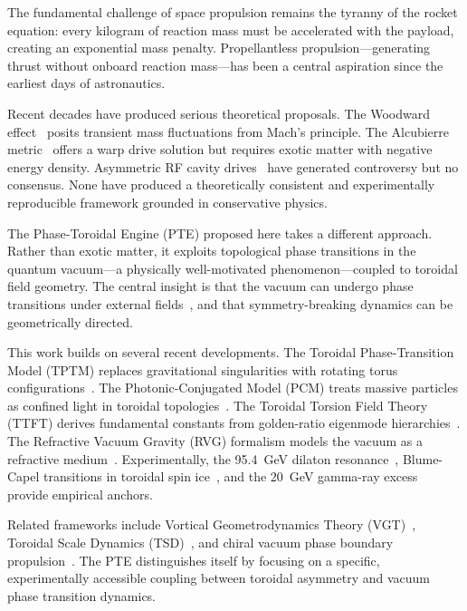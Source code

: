 \documentclass[preprint,12pt]{elsarticle}
\begin{document}
The fundamental challenge of space propulsion remains the tyranny of the rocket equation: every kilogram of reaction mass must be accelerated with the payload, creating an exponential mass penalty. Propellantless propulsion---generating thrust without onboard reaction mass---has been a central aspiration since the earliest days of astronautics.

Recent decades have produced serious theoretical proposals. The Woodward effect~\cite{woodward1990} posits transient mass fluctuations from Mach's principle. The Alcubierre metric~\cite{alcubierre1994} offers a warp drive solution but requires exotic matter with negative energy density. Asymmetric RF cavity drives~\cite{shawyer2008,white2021} have generated controversy but no consensus. None have produced a theoretically consistent and experimentally reproducible framework grounded in conservative physics.

The Phase-Toroidal Engine (PTE) proposed here takes a different approach. Rather than exotic matter, it exploits topological phase transitions in the quantum vacuum---a physically well-motivated phenomenon---coupled to toroidal field geometry. The central insight is that the vacuum can undergo phase transitions under external fields~\cite{volovik2003,wen2004}, and that symmetry-breaking dynamics can be geometrically directed.

This work builds on several recent developments. The Toroidal Phase-Transition Model (TPTM) replaces gravitational singularities with rotating torus configurations~\cite{weinstock2026}. The Photonic-Conjugated Model (PCM) treats massive particles as confined light in toroidal topologies~\cite{caputo2025}. The Toroidal Torsion Field Theory (TTFT) derives fundamental constants from golden-ratio eigenmode hierarchies~\cite{zero2025}. The Refractive Vacuum Gravity (RVG) formalism models the vacuum as a refractive medium~\cite{hofseth2026a}. Experimentally, the 95.4~GeV dilaton resonance~\cite{atlascms2025}, Blume-Capel transitions in toroidal spin ice~\cite{blume2025}, and the 20~GeV gamma-ray excess~\cite{totani2025} provide empirical anchors.

Related frameworks include Vortical Geometrodynamics Theory (VGT)~\cite{hofseth2026b}, Toroidal Scale Dynamics (TSD)~\cite{woodward2026}, and chiral vacuum phase boundary propulsion~\cite{barker2026}. The PTE distinguishes itself by focusing on a specific, experimentally accessible coupling between toroidal asymmetry and vacuum phase transition dynamics.
\end{document}
